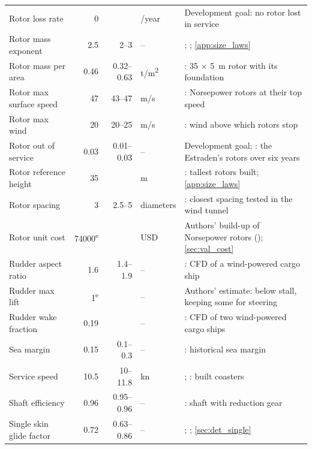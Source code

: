 \begin{longtable}{@{}>{\raggedright\arraybackslash}p{3.4cm}rr>{\raggedright\arraybackslash}p{1.4cm}>{\raggedright\arraybackslash}p{5.8cm}@{}}
Rotor loss rate & \num{0} &  & 1/year & Development goal: no rotor lost in service \\
Rotor mass exponent & \num{2.5} & \num{2}--\num{3} & -- & \citet[blade and tower mass]{fingersh2006}; \citet[p. 3]{norsepower2025}; \cref{app:size_laws} \\
Rotor mass per area & \num{0.46} & \num{0.32}--\num{0.63} & t/m\textsuperscript{2} & \citet[p. 3]{norsepower2025}: 35 \ensuremath{\times} 5~m rotor with its foundation \\
Rotor max surface speed & \num{47} & \num{43}--\num{47} & m/s & \citet[p. 3]{norsepower2025}: Norsepower rotors at their top speed \\
Rotor max wind & \num{20} & \num{20}--\num{25} & m/s & \citet[Table 3]{tillig2020}: wind above which rotors stop \\
Rotor out of service & \num{0.03} & \num{0.01}--\num{0.03} & -- & Development goal; \citet{spliethoff2021}: the Estraden's rotors over six years \\
Rotor reference height & \num{35} &  & m & \citet{maritimeexecutive2024sohar}: tallest rotors built; \cref{app:size_laws} \\
Rotor spacing & \num{3} & \num{2.5}--\num{5} & diameters & \citet{bordogna2020}: closest spacing tested in the wind tunnel \\
Rotor unit cost & \num{74000}\textsuperscript{e} &  & USD & Authors' build-up of Norsepower rotors (\citealp[p. 3]{norsepower2025}); \cref{sec:val_cost} \\
Rudder aspect ratio & \num{1.6} & \num{1.4}--\num{1.9} & -- & \citet{kramer2022}: CFD of a wind-powered cargo ship \\
Rudder max lift & \num{1}\textsuperscript{e} &  & -- & Authors' estimate: below stall, keeping some for steering \\
Rudder wake fraction & \num{0.19} &  & -- & \citet{kramer2022}: CFD of two wind-powered cargo ships \\
Sea margin & \num{0.15} & \num{0.1}--\num{0.3} & -- & \citet{man2011}: historical sea margin \\
Service speed & \num{10.5} & \num{10}--\num{11.8} & kn & \citet{conoship2023cip3800}; \citet{damen2025cf3850}: built coasters \\
Shaft efficiency & \num{0.96} & \num{0.95}--\num{0.96} & -- & \citet{man2011}: shaft with reduction gear \\
Single skin glide factor & \num{0.72} & \num{0.63}--\num{0.86} & -- & \citet[Figs. 9-10]{maughmer1979}; \citet[Table 5]{maslanka2024}; \cref{sec:det_single} \\

\end{longtable}
